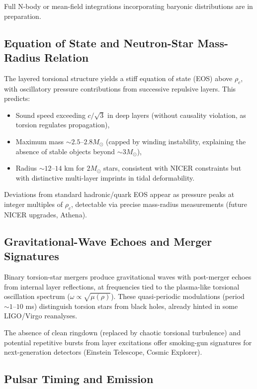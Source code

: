 \documentclass[a4paper]{article}
\begin{document}
Full N-body or mean-field integrations incorporating baryonic distributions are in preparation.

\subsection{Equation of State and Neutron-Star Mass-Radius Relation}

The layered torsional structure yields a stiff equation of state (EOS) above $\rho_c$, with oscillatory pressure contributions from successive repulsive layers. This predicts:
\begin{itemize}
  \item Sound speed exceeding $c/\sqrt{3}$ in deep layers (without causality violation, as torsion regulates propagation),
  \item Maximum mass $\sim 2.5$--$2.8 M_\odot$ (capped by winding instability, explaining the absence of stable objects beyond $\sim 3 M_\odot$),
  \item Radius $\sim 12$--$14$ km for $2 M_\odot$ stars, consistent with NICER constraints but with distinctive multi-layer imprints in tidal deformability.
\end{itemize}

Deviations from standard hadronic/quark EOS appear as pressure peaks at integer multiples of $\rho_c$, detectable via precise mass-radius measurements (future NICER upgrades, Athena).

\subsection{Gravitational-Wave Echoes and Merger Signatures}

Binary torsion-star mergers produce gravitational waves with post-merger echoes from internal layer reflections, at frequencies tied to the plasma-like torsional oscillation spectrum ($\omega \propto \sqrt{\mu(\rho)}$). These quasi-periodic modulations (period $\sim 1$--$10$ ms) distinguish torsion stars from black holes, already hinted in some LIGO/Virgo reanalyses.

The absence of clean ringdown (replaced by chaotic torsional turbulence) and potential repetitive bursts from layer excitations offer smoking-gun signatures for next-generation detectors (Einstein Telescope, Cosmic Explorer).

\subsection{Pulsar Timing and Emission}
\end{document}
